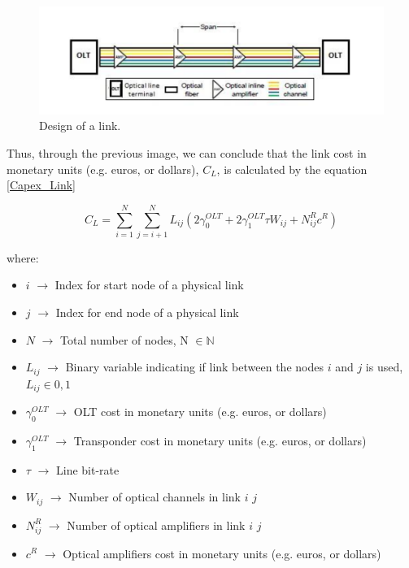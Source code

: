 \begin{figure}[h!]
\centering
\includegraphics[width=\textwidth]{sdf/ILP/figures/link_design}
\caption{Design of a link.}
\label{link_design}
\end{figure}

\newpage
Thus, through the previous image, we can conclude that the link cost in monetary units (e.g. euros, or dollars), $C_L$, is calculated by the equation \ref{Capex_Link}

\begin{equation}
C_L = \sum_{i=1}^N \sum_{j=i+1}^N L_{ij} \left( 2 \gamma_0^{OLT} + 2 \gamma_1^{OLT} \tau W_{ij} + N^R_{ij} c^R \right)
\label{Capex_Link}
\end{equation}

where:
\begin{itemize}
\item{$i$               $\rightarrow$   Index for start node of a physical link}
\item{$j$               $\rightarrow$   Index for end node of a physical link}
\item{$N$				$\rightarrow$	Total number of nodes, N $\in \mathbb{N}$}
\item{$L_{ij}$			$\rightarrow$	Binary variable indicating if link between the nodes $i$ and $j$ is used, $L_{ij} \in {0, 1}$}
\item{$\gamma_0^{OLT}$	$\rightarrow$	OLT cost in monetary units (e.g. euros, or dollars)}
\item{$\gamma_1^{OLT}$	$\rightarrow$	Transponder cost in monetary units (e.g. euros, or dollars)}
\item{$\tau$		    $\rightarrow$	Line bit-rate}
\item{$W_{ij}$          $\rightarrow$   Number of optical channels in link $i$ $j$}
\item{$N^R_{ij}$    	$\rightarrow$	Number of optical amplifiers in link $i$ $j$}
\item{$c^R$				$\rightarrow$	Optical amplifiers cost in monetary units (e.g. euros, or dollars)}
\end{itemize}

